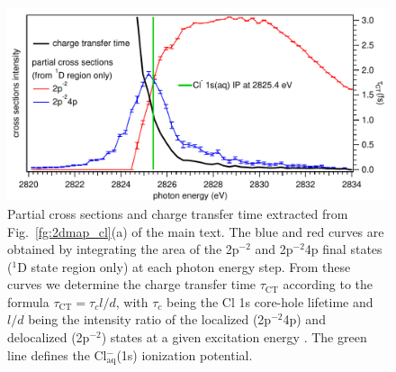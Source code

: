 \documentclass[journal=jpclcd,manuscript=letter]{achemso}
\begin{document}
\begin{figure}
\centering
\includegraphics[scale=0.9]{figures/partial_cross_sec_ct_time.pdf}
\caption{Partial cross sections and charge transfer time extracted from Fig.\ \ref{fg:2dmap_cl}(a) of the main text. The blue and red curves are obtained by integrating the area of the 2p$^{-2}$ and 2p$^{-2}$4p final states ($^1$D state region only) at each photon energy step. From these curves we determine the charge transfer time $\tau_{\text{CT}}$ according to the formula $\tau_{\text{CT}} = \tau_{c} l/d$, with $\tau_{c}$ being the Cl 1s core-hole lifetime and $l/d$ being the intensity ratio of the localized (2p$^{-2}$4p) and delocalized (2p$^{-2}$) states at a given excitation energy \cite{foehlisch05:373}.  The green line defines the Cl$^{-}_{\text{aq}}$(1s) ionization potential.}
\label{fg:si_ct_time}
\end{figure}
%
%
\end{document}

